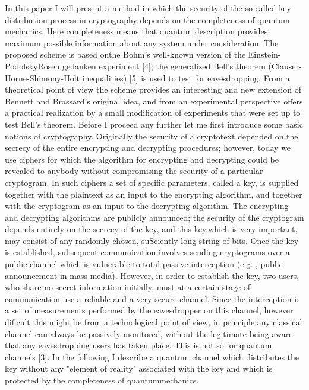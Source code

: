 In this paper I will present a method in which the security of the so-called key distribution process in cryptography depends on the completeness of quantum mechanics. Here completeness means that quantum description provides maximum possible information about any system under consideration. The proposed scheme is based onthe Bohm's well-known version of the Einstein-PodolskyRosen gedanken experiment [4]; the generalized Bell's theorem (Clauser-Horne-Shimony-Holt inequalities) [5] is used to test for eavesdropping. From a theoretical point of view the scheme provides an interesting and new extension of Bennett and Brassard's original idea, and from an experimental perspective offers a practical realization by a small modification of experiments that were set up to test Bell's theorem. Before I proceed any further let me first introduce some basic notions of cryptography.
Originally the security of a cryptotext depended on the secrecy of the entire encrypting and decrypting procedures; however, today we use ciphers for which the algorithm for encrypting and decrypting could be revealed to anybody without compromising the security of a particular cryptogram. In such ciphers a set of specific parameters, called a key, is supplied together with the plaintext as an input to the encrypting algorithm, and together with the cryptogram as an input to the decrypting algorithm. The encrypting and decrypting algorithms are publicly announced; the security of the cryptogram depends entirely on the secrecy of the key, and this key,which is very important, may consist of any randomly chosen, suSciently long string of bits. Once the key is established, subsequent communication involves sending cryptograms over a public channel which is vulnerable to total passive interception (e.g. , public announcement in mass media). However, in order to establish the key, two users, who share no secret information initially, must at a certain stage of communication use a reliable and a very secure channel. Since the interception is a set of measurements performed by the eavesdropper on this channel, however dificult this might be from a technological point of view, in principle any classical channel can always be passively monitored, without the legitimate being aware that any eavesdropping users has taken place. This is not so for quantum channels [3]. In the following I describe a quantum channel which distributes the key without any "element of reality" associated with the key and which is protected by the completeness of quantummechanics.

